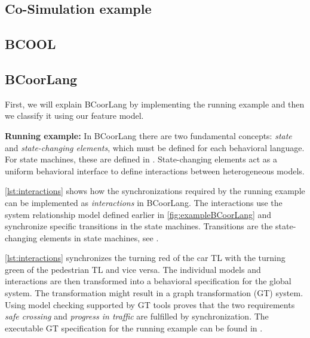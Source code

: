\documentclass[runningheads]{llncs}
\begin{document}
\subsection{Co-Simulation example} %
\subsection{BCOOL} %
\subsection{BCoorLang}
First, we will explain BCoorLang by implementing the running example and then we classify it using our feature model.

\textbf{Running example:} In BCoorLang there are two fundamental concepts: \textit{state} and \textit{state-changing elements}, which must be defined for each behavioral language.
For state machines, these are defined in \cite{krauterBehavioralConsistencyMultimodeling2023}.
State-changing elements act as a uniform behavioral interface to define interactions between heterogeneous models.

\autoref{lst:interactions} shows how the synchronizations required by the running example can be implemented as \textit{interactions} in BCoorLang.
The interactions use the system relationship model defined earlier in \autoref{fig:exampleBCoorLang} and synchronize specific transitions in the state machines.
Transitions are the state-changing elements in state machines, see  \cite{krauterBehavioralConsistencyMultimodeling2023}.



\autoref{lst:interactions} synchronizes the turning red of the car TL with the turning green of the pedestrian TL and vice versa.
The individual models and interactions are then transformed into a behavioral specification for the global system.
The transformation might result in a graph transformation (GT) system.
Using model checking supported by GT tools proves that the two requirements \textit{safe crossing} and \textit{progress in traffic} are fulfilled by synchronization.
The executable GT specification for the running example can be found in \cite{timkrauterArtifactsCoordination2024}.
\end{document}

